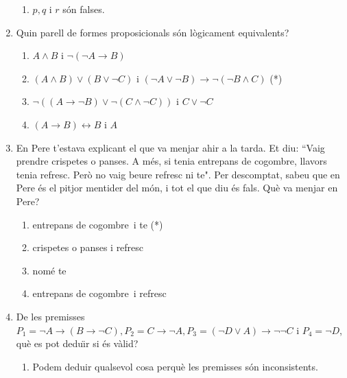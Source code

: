 \begin{enumerate}
\begin{enumerate}
\item $p,q$ i $r$ s\'{o}n falses.
\end{enumerate}

\item Quin parell de formes proposicionals s\'{o}n l\`{o}gicament equivalents?

\begin{enumerate}
\item $A\wedge B$ i $\lnot\left(  \lnot A\longrightarrow B\right)  $

\item $\left(  A\wedge B\right)  \vee\left(  B\vee\lnot C\right)  $ i $\left(
\lnot A\vee\lnot B\right)  \longrightarrow\lnot\left(  \lnot B\wedge C\right)
$ (*)

\item $\lnot\left(  (A\rightarrow\lnot B)\vee\lnot(C\wedge\lnot C)\right)  $ i
$C\vee\lnot C$

\item $\left(  A\longrightarrow B\right)  \longleftrightarrow B$ i $A$
\end{enumerate}

\item En Pere t'estava explicant el que va menjar ahir a la tarda. Et diu:
\textquotedblleft Vaig prendre crispetes o panses. A m\'{e}s, si tenia
entrepans de cogombre, llavors tenia refresc. Per\`{o} no vaig beure refresc
ni te". Per descomptat, sabeu que en Pere \'{e}s el pitjor mentider del
m\'{o}n, i tot el que diu \'{e}s fals. Qu\`{e} va menjar en Pere?

\begin{enumerate}
\item entrepans de cogombre\thinspace\ i te (*)

\item crispetes o panses i refresc

\item nom\'{e} te

\item entrepans de cogombre\thinspace\ i refresc
\end{enumerate}

\item De les premisses $P_{1}=\lnot A\longrightarrow\left(  B\longrightarrow
\lnot C\right)  ,P_{2}=C\longrightarrow\lnot A,P_{3}=\left(  \lnot D\vee
A\right)  \longrightarrow\lnot\lnot C$ i $P_{4}=\lnot D$, qu\`{e} es pot
dedu\"{\i}r si \'{e}s v\`{a}lid?

\begin{enumerate}
\item Podem deduir qualsevol cosa perqu\`{e} les premisses s\'{o}n inconsistents.


\end{enumerate}
\end{enumerate}
